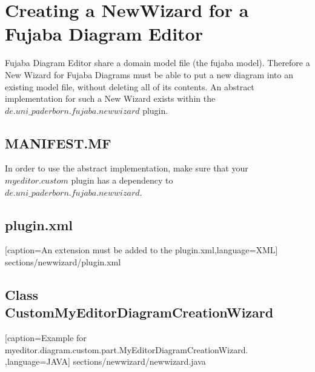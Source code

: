 \section {Creating a NewWizard for a Fujaba Diagram Editor}
Fujaba Diagram Editor share a domain model file (the fujaba model).
Therefore a New Wizard for Fujaba Diagrams must be able to put a new
diagram into an existing model file, without deleting all of its contents.
An abstract implementation for such a New Wizard exists within the
$de.uni\_paderborn.fujaba.newwizard$ plugin.

\subsection {MANIFEST.MF}
In order to use the abstract implementation, make sure that your
$myeditor.custom$ plugin has a dependency to
$de.uni\_paderborn.fujaba.newwizard$.

\subsection {plugin.xml}

[caption={An extension must be added to the
plugin.xml}\label{lst:javaclass},language=XML]
{sections/newwizard/plugin.xml}


\subsection {Class CustomMyEditorDiagramCreationWizard}

[caption={Example for
myeditor.diagram.custom.part.MyEditorDiagramCreationWizard.}
\label{lst:javaclass},language=JAVA] {sections/newwizard/newwizard.java}
